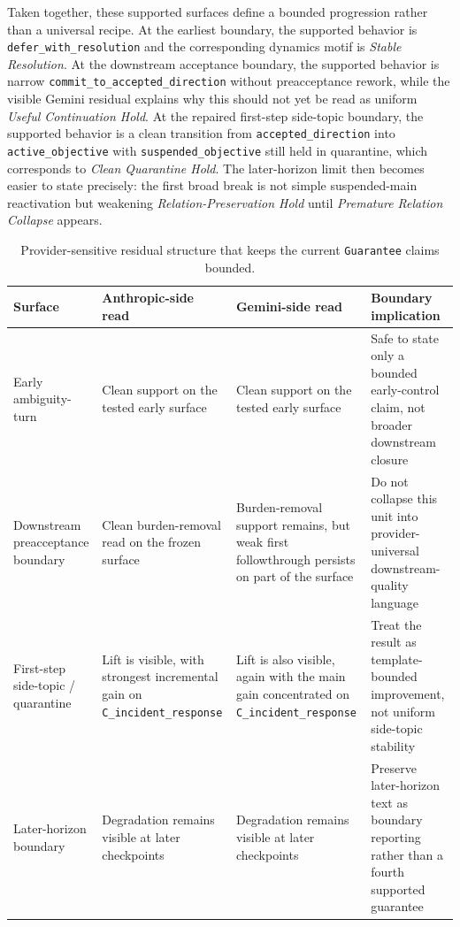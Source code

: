 \documentclass[11pt]{article}
\begin{document}
Taken together, these supported surfaces define a bounded progression rather than
a universal recipe. At the earliest boundary, the supported behavior is
\texttt{defer\_with\_resolution} and the corresponding dynamics motif is
\textit{Stable Resolution}. At the downstream acceptance boundary, the supported
behavior is narrow \texttt{commit\_to\_accepted\_direction} without preacceptance
rework, while the visible Gemini residual explains why this should not yet be
read as uniform \textit{Useful Continuation Hold}. At the repaired first-step
side-topic boundary, the supported behavior is a clean transition from
\texttt{accepted\_direction} into \texttt{active\_objective} with
\texttt{suspended\_objective} still held in quarantine, which corresponds to
\textit{Clean Quarantine Hold}. The later-horizon limit then becomes easier to
state precisely: the first broad break is not simple suspended-main reactivation
but weakening \textit{Relation-Preservation Hold} until \textit{Premature
Relation Collapse} appears.

\begin{table}[ht]
\centering
\begin{tabular}{|p{}|p{}|p{}|p{}|}
\hline
\textbf{Surface} & \textbf{Anthropic-side read} & \textbf{Gemini-side read} & \textbf{Boundary implication} \\
\hline
Early ambiguity-turn & Clean support on the tested early surface & Clean support on the tested early surface & Safe to state only a bounded early-control claim, not broader downstream closure \\
\hline
Downstream preacceptance boundary & Clean burden-removal read on the frozen surface & Burden-removal support remains, but weak first followthrough persists on part of the surface & Do not collapse this unit into provider-universal downstream-quality language \\
\hline
First-step side-topic / quarantine & Lift is visible, with strongest incremental gain on \texttt{C\_incident\_response} & Lift is also visible, again with the main gain concentrated on \texttt{C\_incident\_response} & Treat the result as template-bounded improvement, not uniform side-topic stability \\
\hline
Later-horizon boundary & Degradation remains visible at later checkpoints & Degradation remains visible at later checkpoints & Preserve later-horizon text as boundary reporting rather than a fourth supported guarantee \\
\hline
\end{tabular}
\caption{Provider-sensitive residual structure that keeps the current
\texttt{Guarantee} claims bounded.}
\end{table}
\end{document}

